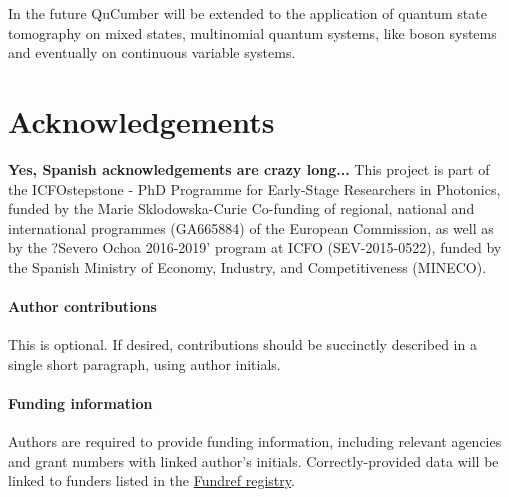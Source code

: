 \documentclass[submission, Phys]{SciPost}
\begin{document}
In the future QuCumber will be extended to the application of quantum state tomography on mixed states, multinomial quantum systems, like boson systems and eventually on continuous variable systems.

\section*{Acknowledgements}
\textbf{Yes, Spanish acknowledgements are crazy long...}
This project is part of the ICFOstepstone - PhD Programme for Early-Stage Researchers in Photonics, funded by the Marie Sklodowska-Curie Co-funding of regional, national and international programmes (GA665884) of the European Commission, as well as by the ?Severo Ochoa 2016-2019' program at ICFO (SEV-2015-0522), funded by the Spanish Ministry of Economy, Industry, and Competitiveness (MINECO).

\paragraph{Author contributions}
This is optional. If desired, contributions should be succinctly described in a single short paragraph, using author initials.

\paragraph{Funding information}
Authors are required to provide funding information, including relevant agencies and grant numbers with linked author's initials. Correctly-provided data will be linked to funders listed in the \href{https://www.crossref.org/services/funder-registry/}{\sf Fundref registry}.
\end{document}
